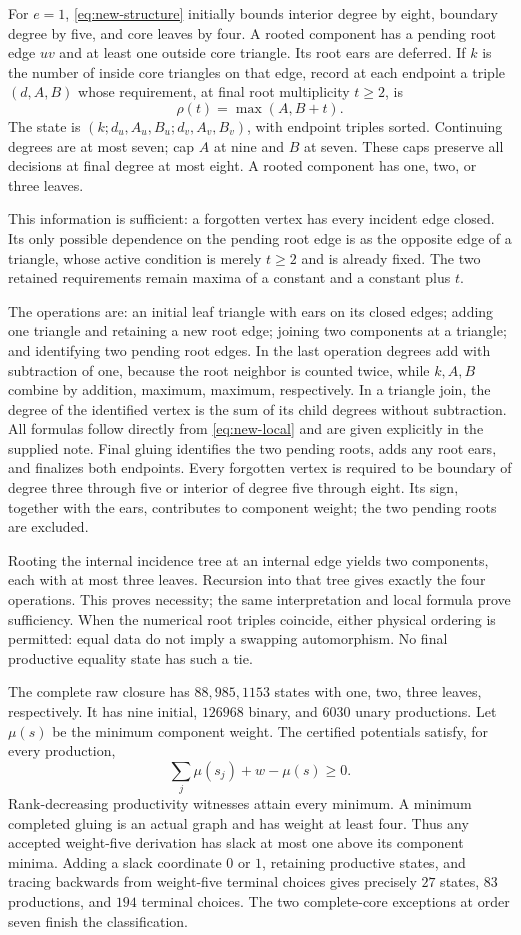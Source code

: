 For $e=1$, \eqref{eq:new-structure} initially bounds interior degree
by eight, boundary degree by five, and core leaves by four.  A rooted
component has a pending root edge $uv$ and at least one outside core
triangle.  Its root ears are deferred.  If $k$ is the number of inside
core triangles on that edge, record at each endpoint a triple
$(d,A,B)$ whose requirement, at final root multiplicity $t\ge2$, is
\[
 \rho(t)=\max(A,B+t).
\]
The state is $(k;d_u,A_u,B_u;d_v,A_v,B_v)$, with endpoint triples
sorted.  Continuing degrees are at most seven; cap $A$ at nine and
$B$ at seven.  These caps preserve all decisions at final degree at
most eight.  A rooted component has one, two, or three leaves.

This information is sufficient: a forgotten vertex has every incident
edge closed.  Its only possible dependence on the pending root edge
is as the opposite edge of a triangle, whose active condition is
merely $t\ge2$ and is already fixed.  The two retained requirements
remain maxima of a constant and a constant plus $t$.

The operations are: an initial leaf triangle with ears on its closed
edges; adding one triangle and retaining a new root edge; joining
two components at a triangle; and identifying two pending root
edges.  In the last operation degrees add with subtraction of one,
because the root neighbor is counted twice, while $k,A,B$ combine by
addition, maximum, maximum, respectively.  In a triangle join, the
degree of the identified vertex is the sum of its child degrees
without subtraction.  All formulas follow directly from
\eqref{eq:new-local} and are given explicitly in the supplied note.
Final gluing identifies the two pending roots, adds any root ears,
and finalizes both endpoints.  Every forgotten vertex is required
to be boundary of degree three through five or interior of degree
five through eight.  Its sign, together with the ears, contributes
to component weight; the two pending roots are excluded.

Rooting the internal incidence tree at an internal edge yields two
components, each with at most three leaves.  Recursion into that
tree gives exactly the four operations.  This proves necessity;
the same interpretation and local formula prove sufficiency.
When the numerical root triples coincide, either physical ordering
is permitted: equal data do not imply a swapping automorphism.
No final productive equality state has such a tie.

The complete raw closure has $88,985,1153$ states with one, two,
three leaves, respectively.  It has nine initial, $126968$ binary,
and $6030$ unary productions.  Let $\mu(s)$ be the minimum component
weight.  The certified potentials satisfy, for every production,
\[
 \sum_j\mu(s_j)+w-\mu(s)\ge0.
\]
Rank-decreasing productivity witnesses attain every minimum.  A
minimum completed gluing is an actual graph and has weight at least
four.  Thus any accepted weight-five derivation has slack at most
one above its component minima.  Adding a slack coordinate $0$ or
$1$, retaining productive states, and tracing backwards from
weight-five terminal choices gives precisely $27$ states, $83$
productions, and $194$ terminal choices.  The two complete-core
exceptions at order seven finish the classification.

